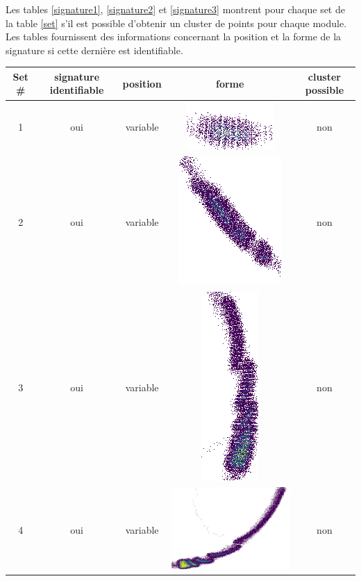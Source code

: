 Les tables \ref{signature1}, \ref{signature2} et \ref{signature3} montrent pour chaque set de la table \ref{set} s'il est possible d'obtenir un cluster de points pour chaque module. Les tables fournissent des informations concernant la position et la forme de la signature si cette dernière est identifiable.

\newpage

\begin{table}[h]
\centering
\begin{tabular}{|c|c|c|c|c|}
\hline
Set \# & signature identifiable & position & forme & cluster possible\\
\hline
1 & oui & variable & \includegraphics[scale=0.2]{images/set1.png} & non \\
\hline
2 & oui & variable & \includegraphics[scale=0.2]{images/set2.png} & non \\
\hline
3 & oui & variable & \includegraphics[scale=0.35]{images/set3.png} & non \\
\hline
4 & oui & variable & \includegraphics[scale=0.2]{images/set4.png} & non \\

\end{tabular}
\end{table}
